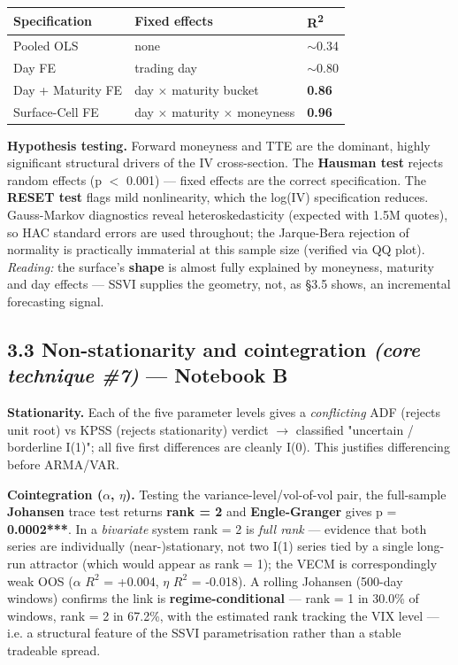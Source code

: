 \documentclass[10pt,a4paper]{article}
\begin{document}
\begin{center}\small
\begin{tabular}{lll}
\toprule
\textbf{Specification} & \textbf{Fixed effects} & \textbf{R\textsuperscript{2}} \\
\midrule
Pooled OLS & none & $\sim$0.34 \\
Day FE & trading day & $\sim$0.80 \\
Day + Maturity FE & day $\times$ maturity bucket & \textbf{0.86} \\
Surface-Cell FE & day $\times$ maturity $\times$ moneyness & \textbf{0.96} \\
\bottomrule
\end{tabular}
\end{center}

\textbf{Hypothesis testing.} Forward moneyness and TTE are the dominant, highly significant structural drivers of the IV cross-section. The \textbf{Hausman test} rejects random effects (p $<$ 0.001) --- fixed effects are the correct specification. The \textbf{RESET test} flags mild nonlinearity, which the log(IV) specification reduces. Gauss-Markov diagnostics reveal heteroskedasticity (expected with 1.5M quotes), so HAC standard errors are used throughout; the Jarque-Bera rejection of normality is practically immaterial at this sample size (verified via QQ plot). \textit{Reading:} the surface's \textbf{shape} is almost fully explained by moneyness, maturity and day effects --- SSVI supplies the geometry, not, as \S{}3.5 shows, an incremental forecasting signal.

\subsection*{3.3 Non-stationarity and cointegration \textit{(core technique \#7)} --- Notebook B}

\textbf{Stationarity.} Each of the five parameter levels gives a \textit{conflicting} ADF (rejects unit root) vs KPSS (rejects stationarity) verdict $\rightarrow$ classified "uncertain / borderline I(1)"; all five first differences are cleanly I(0). This justifies differencing before ARMA/VAR.

\textbf{Cointegration ($\alpha$, $\eta$).} Testing the variance-level/vol-of-vol pair, the full-sample \textbf{Johansen} trace test returns \textbf{rank = 2} and \textbf{Engle-Granger} gives p = \textbf{0.0002***}. In a \textit{bivariate} system rank = 2 is \textit{full rank} --- evidence that both series are individually (near-)stationary, not two I(1) series tied by a single long-run attractor (which would appear as rank = 1); the VECM is correspondingly weak OOS ($\alpha$ $R^2$ = +0.004, $\eta$ $R^2$ = -0.018). A rolling Johansen (500-day windows) confirms the link is \textbf{regime-conditional} --- rank = 1 in 30.0\% of windows, rank = 2 in 67.2\%, with the estimated rank tracking the VIX level --- i.e. a structural feature of the SSVI parametrisation rather than a stable tradeable spread.
\end{document}
